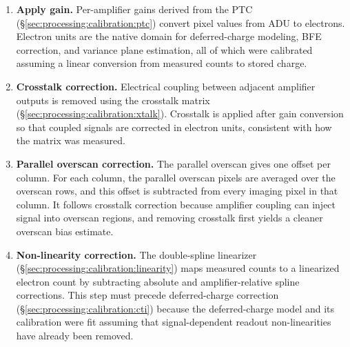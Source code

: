 \begin{enumerate}
    \item \textbf{Apply gain.}
    Per-amplifier gains derived from the PTC (\S\ref{sec:processing:calibration:ptc}) convert pixel values from ADU to electrons.
    Electron units are the native domain for deferred-charge modeling, BFE correction, and variance plane estimation, all of which were calibrated assuming a linear conversion from measured counts to stored charge.  

    \item \textbf{Crosstalk correction.}
    Electrical coupling between adjacent amplifier outputs is removed using the crosstalk matrix (\S\ref{sec:processing:calibration:xtalk}).
    Crosstalk is applied after gain conversion so that coupled signals are corrected in electron units, consistent with how the matrix was measured. 

    \item \textbf{Parallel overscan correction.}
    The parallel overscan gives one offset per column.
    For each column, the parallel overscan pixels are averaged over the overscan rows, and this offset is subtracted from every imaging pixel in that column. 
    It follows crosstalk correction because amplifier coupling can inject signal into overscan regions, and removing crosstalk first yields a cleaner overscan bias estimate.

    \item \textbf{Non-linearity correction.}
    The double-spline linearizer (\S\ref{sec:processing:calibration:linearity}) maps measured counts to a linearized electron count by subtracting absolute and amplifier-relative spline corrections.
    This step must precede deferred-charge correction  (\S\ref{sec:processing:calibration:cti}) because the deferred-charge model and its calibration were fit assuming that signal-dependent readout non-linearities have already been removed. 


\end{enumerate}
